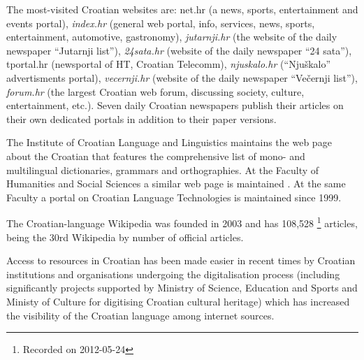 \begin{multicols}{2}
The most-visited Croatian websites are: net.hr (a news, sports, entertainment and events portal), \emph{index.hr} (general web portal, info, services, news, sports, entertainment, automotive, gastronomy), \emph{jutarnji.hr} (the website of the daily newspaper “Jutarnji list”), \emph{24sata.hr} (website of the daily newspaper “24 sata”), tportal.hr (newsportal of HT, Croatian Telecomm), \emph{njuskalo.hr} (“Njuškalo” advertisments portal), \emph{vecernji.hr} (website of the daily newspaper “Večernji list”), \emph{forum.hr} (the largest Croatian web forum, discussing society, culture, entertainment, etc.). Seven daily Croatian newspapers publish their articles on their own dedicated portals in addition to their paper versions.


The Institute of Croatian Language and Linguistics maintains the web page about the Croatian that features the comprehensive list of mono- and multilingual dictionaries, grammars and orthographies. At the Faculty of Humanities and Social Sciences a similar web page is maintained \cite{str11}. At the same Faculty a portal on Croatian Language Technologies \cite{str12} is maintained since 1999.

The Croatian-language Wikipedia was founded in 2003 and has 108,528 \footnote{Recorded on 2012-05-24} articles, being the 30rd Wikipedia by number of official articles.

Access to resources in Croatian has been made easier in recent times by Croatian institutions and organisations undergoing the digitalisation process (including significantly projects supported by Ministry of Science, Education and Sports and Ministy of Culture for digitising Croatian cultural heritage) which has increased the visibility of the Croatian language among internet sources.

\end{multicols}

\clearpage



